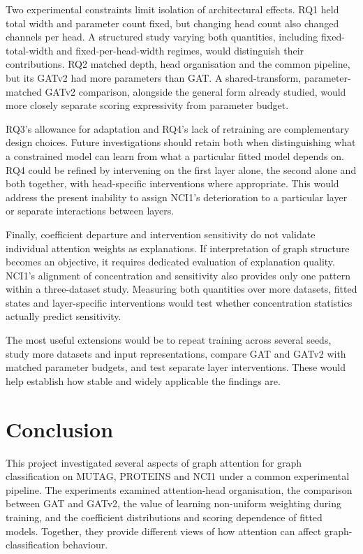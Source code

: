 \documentclass[11pt,a4paper]{article}
\begin{document}
Two experimental constraints limit isolation of architectural effects. RQ1 held total width and parameter count fixed, but changing head count also changed channels per head. A structured study varying both quantities, including fixed-total-width and fixed-per-head-width regimes, would distinguish their contributions. RQ2 matched depth, head organisation and the common pipeline, but its GATv2 had more parameters than GAT. A shared-transform, parameter-matched GATv2 comparison, alongside the general form already studied, would more closely separate scoring expressivity from parameter budget.

RQ3's allowance for adaptation and RQ4's lack of retraining are complementary design choices. Future investigations should retain both when distinguishing what a constrained model can learn from what a particular fitted model depends on. RQ4 could be refined by intervening on the first layer alone, the second alone and both together, with head-specific interventions where appropriate. This would address the present inability to assign NCI1's deterioration to a particular layer or separate interactions between layers.

Finally, coefficient departure and intervention sensitivity do not validate individual attention weights as explanations. If interpretation of graph structure becomes an objective, it requires dedicated evaluation of explanation quality. NCI1's alignment of concentration and sensitivity also provides only one pattern within a three-dataset study. Measuring both quantities over more datasets, fitted states and layer-specific interventions would test whether concentration statistics actually predict sensitivity.

\enlargethispage{3\baselineskip}
The most useful extensions would be to repeat training across several seeds, study more datasets and input representations, compare GAT and GATv2 with matched parameter budgets, and test separate layer interventions. These would help establish how stable and widely applicable the findings are.





\clearpage
\section{Conclusion}
\label{sec:conclusion}

This project investigated several aspects of graph attention for graph classification on MUTAG, PROTEINS and NCI1 under a common experimental pipeline. The experiments examined attention-head organisation, the comparison between GAT and GATv2, the value of learning non-uniform weighting during training, and the coefficient distributions and scoring dependence of fitted models. Together, they provide different views of how attention can affect graph-classification behaviour.
\end{document}
